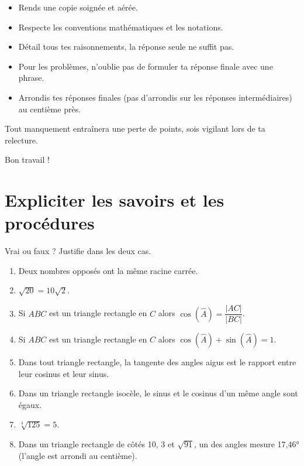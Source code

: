 \documentclass[a4paper, 12pt, parskip=half-, twoside=semi]{scrartcl}
\begin{document}
\pagestyle{empty}
\entete
{}
\begin{itemize}
    \item Rends une copie soignée et aérée.
    \item Respecte les conventions mathématiques et les notations.
    \item Détail tous tes raisonnements, la réponse seule ne suffit pas.
    \item Pour les problèmes, n'oublie pas de formuler ta réponse finale  avec une phrase.
    \item Arrondis tes réponses finales (pas d'arrondis sur les réponses intermédiaires) au centième près.
\end{itemize}
 Tout manquement entraînera une perte de points, sois vigilant lors de ta relecture.
\vfill
\begin{flushright}
    Bon travail !
\end{flushright}
\cleardoublepage
\pagestyle{plain}
\setcounter{page}{1}
\section*{ Expliciter les savoirs et les procédures}
\begin{connaitre}[points=8]
    Vrai ou faux ? Justifie dans les deux cas.
    \begin{enumerate}[itemsep=1em]
        \item Deux nombres opposés ont la même racine carrée.
        \item \(\sqrt{20}=10\sqrt{2}\).
        \item Si \(ABC\) est un triangle rectangle en \(C\) alors \(\cos\left(\widehat{A}\right) = \dfrac{|AC|}{|BC|}\).
        \item Si \(ABC\) est un triangle rectangle en \(C\) alors \(\cos\left(\widehat{A}\right) + \sin\left(\widehat{A}\right)=1\).
        \item Dans tout triangle rectangle, la tangente des angles aigus est le rapport entre leur cosinus et leur sinus.
        \item Dans un triangle rectangle isocèle, le sinus et le cosinus d'un même angle sont égaux.
        \item \(\sqrt[3]{125}=5\).
        \item Dans un triangle rectangle de côtés 10, 3 et \(\sqrt{91}\), un des angles mesure \ang{17,46} (l'angle est arrondi au centième).
    \end{enumerate}
\end{connaitre}
\end{document}
